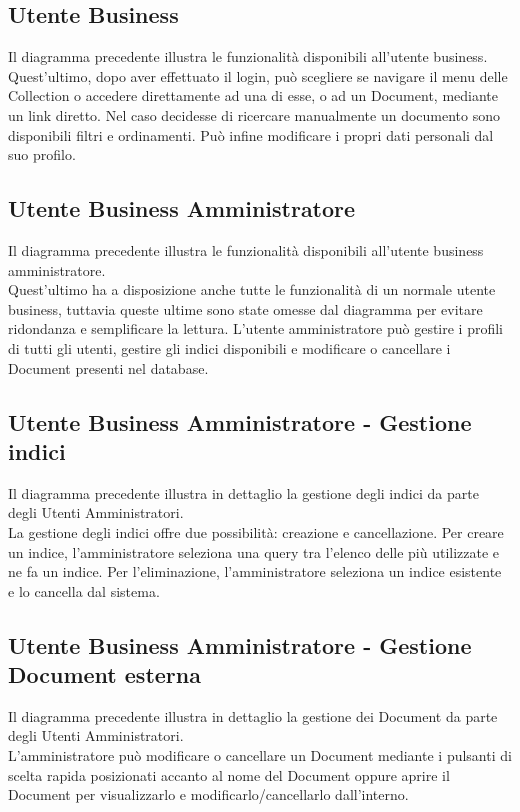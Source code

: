 
\subsection{Utente Business}
Il diagramma precedente illustra le funzionalità disponibili all'utente business.\\
Quest'ultimo, dopo aver effettuato il login, può scegliere se navigare il menu delle Collection o accedere direttamente ad una di esse, o ad un Document, mediante un link diretto.
Nel caso decidesse di ricercare manualmente un documento sono disponibili filtri e ordinamenti.
Può infine modificare i propri dati personali dal suo profilo.

\subsection{Utente Business Amministratore}
Il diagramma precedente illustra le funzionalità disponibili all'utente business amministratore.\\
Quest'ultimo ha a disposizione anche tutte le funzionalità di un normale utente business, tuttavia queste ultime sono state omesse dal diagramma per evitare ridondanza e semplificare la lettura.
L'utente amministratore può gestire i profili di tutti gli utenti, gestire gli indici disponibili e modificare o cancellare i Document presenti nel database.

\subsection{Utente Business Amministratore - Gestione indici}
Il diagramma precedente illustra in dettaglio la gestione degli indici da parte degli Utenti Amministratori.\\
La gestione degli indici offre due possibilità: creazione e cancellazione.
Per creare un indice, l'amministratore seleziona una query tra l'elenco delle più utilizzate e ne fa un indice.
Per l'eliminazione, l'amministratore seleziona un indice esistente e lo cancella dal sistema.

\subsection{Utente Business Amministratore - Gestione Document esterna}
Il diagramma precedente illustra in dettaglio la gestione dei Document da parte degli Utenti Amministratori.\\
L'amministratore può modificare o cancellare un Document mediante i pulsanti di scelta rapida posizionati accanto al nome del Document oppure aprire il Document per visualizzarlo e modificarlo/cancellarlo dall'interno.


